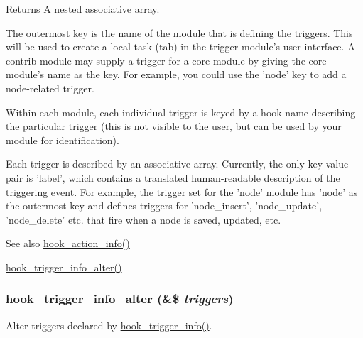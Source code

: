 \begin{DoxyReturn}{Returns}
A nested associative array.
\begin{DoxyItemize}
\item The outermost key is the name of the module that is defining the triggers. This will be used to create a local task (tab) in the trigger module's user interface. A contrib module may supply a trigger for a core module by giving the core module's name as the key. For example, you could use the 'node' key to add a node-\/related trigger.
\begin{DoxyItemize}
\item Within each module, each individual trigger is keyed by a hook name describing the particular trigger (this is not visible to the user, but can be used by your module for identification).
\begin{DoxyItemize}
\item Each trigger is described by an associative array. Currently, the only key-\/value pair is 'label', which contains a translated human-\/readable description of the triggering event. For example, the trigger set for the 'node' module has 'node' as the outermost key and defines triggers for 'node\_\-insert', 'node\_\-update', 'node\_\-delete' etc. that fire when a node is saved, updated, etc.
\end{DoxyItemize}
\end{DoxyItemize}
\end{DoxyItemize}
\end{DoxyReturn}
\begin{DoxySeeAlso}{See also}
\hyperlink{group__actions_ga3df26c5d6496c91fcd0edd8648023fb4}{hook\_\-action\_\-info()} 

\hyperlink{group__hooks_gae39072ea60b8856675663f51d5355d57}{hook\_\-trigger\_\-info\_\-alter()} 
\end{DoxySeeAlso}
\hypertarget{group__hooks_gae39072ea60b8856675663f51d5355d57}{
\subsubsection[{hook\_\-trigger\_\-info\_\-alter}]{\setlength{\rightskip}{0pt plus 5cm}hook\_\-trigger\_\-info\_\-alter (\&\$ {\em triggers})}}
\label{group__hooks_gae39072ea60b8856675663f51d5355d57}
Alter triggers declared by \hyperlink{group__hooks_ga6796483976be1fa22589582444c6fdbb}{hook\_\-trigger\_\-info()}.


